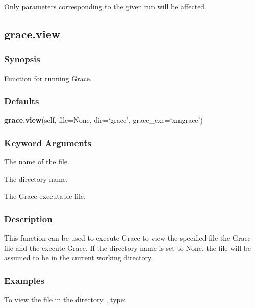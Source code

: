 Only parameters corresponding to the given run will be affected.




\newpage

\subsection{grace.view}


\subsubsection{Synopsis}

Function for running Grace.



\subsubsection{Defaults}

\textsf{\textbf{grace.view}(self, file=None, dir=`grace', grace\_exe=`xmgrace')}


\subsubsection{Keyword Arguments}

  The name of the file. 

  The directory name. 

  The Grace executable file. 




\subsubsection{Description}

This function can be used to execute Grace to view the specified file the Grace  file and the execute Grace. If the directory name is set to None, the file will be assumed to be in the current working directory.



\subsubsection{Examples}

To view the file  in the directory , type:


